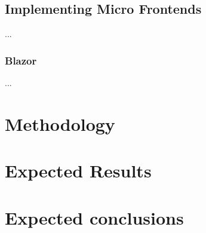 \subsection{Implementing Micro Frontends}
...
\subsubsection{Blazor}
...




\section{Methodology}
\label{sec:methodology}



\section{Expected Results}
\label{sec:expected-results}



\section{Expected conclusions}
\label{sec:expected-conclusions}


